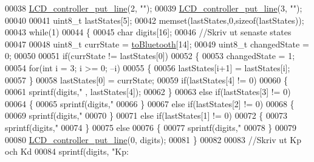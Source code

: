 \begin{DoxyCode}
00038     \hyperlink{_l_c_d__controller_8c_ac9b4126229db48d14f07d3ea3178b48a}{LCD\_controller\_put\_line}(2, \textcolor{stringliteral}{""});
00039     \hyperlink{_l_c_d__controller_8c_ac9b4126229db48d14f07d3ea3178b48a}{LCD\_controller\_put\_line}(3, \textcolor{stringliteral}{""});
00040     
00041     uint8\_t lastStates[5];
00042     memset(lastStates,0,\textcolor{keyword}{sizeof}(lastStates));
00043     \textcolor{keywordflow}{while}(1)
00044     \{
00045         \textcolor{keywordtype}{char} digits[16];
00046         \textcolor{comment}{//Skriv ut senaste states}
00047         
00048         uint8\_t currState = \hyperlink{_buffers_8h_af10085b37b41fff01ad209e47f7d4e44}{toBluetooth}[14];
00049         uint8\_t changedState = 0;
00050         
00051         \textcolor{keywordflow}{if}(currState != lastStates[0])
00052         \{
00053             changedState = 1;
00054             \textcolor{keywordflow}{for}(\textcolor{keywordtype}{int} i = 3; i >= 0; --i)
00055             \{
00056                 lastStates[i+1] = lastStates[i];
00057             \}
00058             lastStates[0] = currState;
00059             \textcolor{keywordflow}{if}(lastStates[4] != 0)
00060             \{
00061                 sprintf(digits,\textcolor{stringliteral}{"%
      , lastStates[4]);
00062             \}
00063             \textcolor{keywordflow}{else} \textcolor{keywordflow}{if}(lastStates[3] != 0)
00064             \{
00065                 sprintf(digits,\textcolor{stringliteral}{"%
00066             \}
00067             \textcolor{keywordflow}{else} \textcolor{keywordflow}{if}(lastStates[2] != 0)
00068             \{
00069                 sprintf(digits,\textcolor{stringliteral}{"%
00070             \}
00071             \textcolor{keywordflow}{else} \textcolor{keywordflow}{if}(lastStates[1] != 0)
00072             \{
00073                 sprintf(digits,\textcolor{stringliteral}{"%
00074             \}
00075             \textcolor{keywordflow}{else}
00076             \{
00077                 sprintf(digits,\textcolor{stringliteral}{"%
00078             \}
00079             
00080             \hyperlink{_l_c_d__controller_8c_ac9b4126229db48d14f07d3ea3178b48a}{LCD\_controller\_put\_line}(0, digits);
00081         \}
00082         
00083         \textcolor{comment}{//Skriv ut Kp och Kd}
00084         sprintf(digits, \textcolor{stringliteral}{"Kp:%
}}}}}}
\end{DoxyCode}
